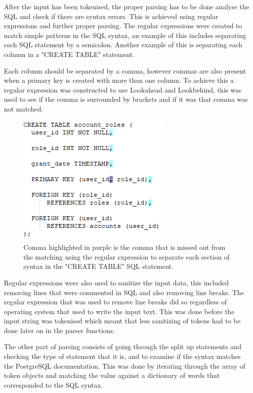 After the input has been tokenised, the proper parsing has to be done analyse the SQL and check if there are syntax errors. This is achieved using regular expressions and further proper parsing. The regular expressions were created to match simple patterns in the SQL syntax, an example of this includes separating each SQL statement by a semicolon. Another example of this is separating each column in a "CREATE TABLE" statement. 

Each column should be separated by a comma, however commas are also present when a primary key is created with more than one column. To achieve this a regular expression was constructed to use Lookahead and Lookbehind, this was used to see if the comma is surrounded by brackets and if it was that comma was not matched.

\begin{figure}[h!]
	\centering
	\includegraphics{regex}
	\caption{Comma highlighted in purple is the comma that is missed out from the matching using the regular expression to separate each section of syntax in the "CREATE TABLE" SQL statement.}
	\label{fig:regex}
\end{figure}

Regular expressions were also used to sanitize the input data, this included removing lines that were commented in SQL and also removing line breaks. The regular expression that was used to remove line breaks did so regardless of operating system that used to write the input text. This was done before the input string was tokenised which meant that less sanitizing of tokens had to be done later on in the parser functions.

The other part of parsing consists of going through the split up statements and checking the type of statement that it is, and to examine if the syntax matches the PostgreSQL documentation.  This was done by iterating through the array of token objects and matching the value against a dictionary of words that corresponded to the SQL syntax. 

